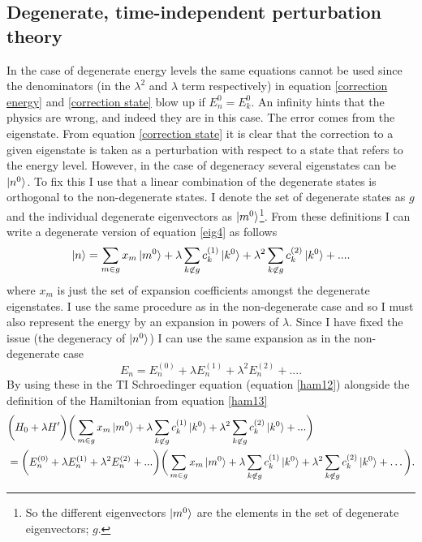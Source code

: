 \subsection*{Degenerate, time-independent perturbation theory}
In the case of degenerate energy levels the same equations cannot be used since the denominators (in the $\lambda^2
$ and $\lambda$ term respectively) in equation \eqref{correction energy} and \eqref{correction state} blow up if $E_n^0=E_k^0$. An infinity hints that the physics are wrong, and indeed they are in this case. The error comes from the eigenstate. From equation \eqref{correction state} it is clear that the correction to a given eigenstate is taken as a perturbation with respect to a state that refers to the energy level. However, in the case of degeneracy several eigenstates can be $\ket{n^0}$. To fix this I use that a linear combination of the degenerate states is orthogonal to the non-degenerate states. I denote the set of degenerate states as $g$ and the individual degenerate eigenvectors as $\ket{m^0}$\footnote{So the different eigenvectors $\ket{m^0}$ are the elements in the set of degenerate eigenvectors; $g$.}. From these definitions I can write a degenerate version of equation \eqref{eig4} as follows
\begin{equation}
	\ket{n}=\sum_{m\in g}x_m\ket{m^0}+\lambda\sum_{k\not\in g}c_k^{(1)}\ket{k^0}+\lambda^2\sum_{k\not\in g}c_k^{(2)}\ket{k^0}+....
	\label{correction state1}
\end{equation} 
where $x_m$ is just the set of expansion coefficients amongst the degenerate eigenstates. I use the same procedure as in the non-degenerate case and so I must also represent the energy by an expansion in powers of $\lambda$. Since I have fixed the issue (the degeneracy of $\ket{n^0}$) I can use the same expansion as in the non-degenerate case
\begin{equation}
	E_n=E_n^{(0)}+\lambda E_n^{(1)}+\lambda^2E_n^{(2)}+....
\end{equation} 
By using these in the TI Schroedinger equation (equation \eqref{ham12}) alongside the definition of the Hamiltonian from equation \eqref{ham13}
\begin{equation}
	\begin{split}
		&\bigg(H_0+\lambda H'\bigg)\bigg(\sum_{m\in g}x_m\ket{m^0}+\lambda\sum_{k\not\in g}c_k^{(1)}\ket{k^0}+\lambda^2\sum_{k\not\in g}c_k^{(2)}\ket{k^0}+...\bigg)\\
		&=\bigg(E_n^{(0)}+\lambda E_n^{(1)}+\lambda^2E_n^{(2)}+...\bigg)\bigg(\sum_{m\in g}x_m\ket{m^0}+\lambda\sum_{k\not\in g}c_k^{(1)}\ket{k^0}+\lambda^2\sum_{k\not\in g}c_k^{(2)}\ket{k^0}+\dots\bigg).
	\end{split}
\end{equation} 
